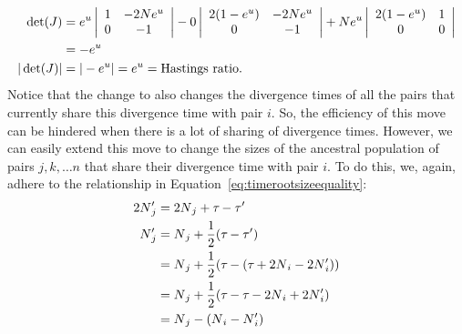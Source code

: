 \begin{linenomath}
\begin{equation}
\begin{split}
    \det(J) & = e^{\uniformdeviate} \left|\begin{array}{cc}
        1 &
        -2\sepopsize[\rootpopindex]e^{\uniformdeviate} \\
        0 &
        -1 
    \end{array}\right| - 0 \left|\begin{array}{cc}
        2(1 - e^{\uniformdeviate}) &
        -2\sepopsize[\rootpopindex]e^{\uniformdeviate} \\
        0 &
        -1
    \end{array}\right| + \sepopsize[\rootpopindex]e^{\uniformdeviate} \left|\begin{array}{cc}
        2(1 - e^{\uniformdeviate}) &
        1 \\
        0 &
        0 \\
    \end{array}\right| \\
    & = -e^{\uniformdeviate} \\
    |\det(J)| & = |-e^{\uniformdeviate}| = e^{\uniformdeviate} = \textrm{Hastings ratio}.
\end{split}
\end{equation}
Notice that the change to \divtime also changes the divergence times
of all the pairs that currently share this divergence time with pair $i$.
So, the efficiency of this move can be hindered when there is a lot of sharing
of divergence times.
However, we can easily extend this move to change the sizes of the ancestral
population of pairs $j, k, \ldots n$ that share their divergence time with
pair $i$.
To do this, we, again, adhere to the relationship in
Equation~\ref{eq:timerootsizeequality}:
\begin{equation}
\begin{split}
    2\sepopsize[\rootpopindex]{}_j\proposed
    & =
    2\sepopsize[\rootpopindex]{}_j + \divtime - \divtime\proposed \\
    \sepopsize[\rootpopindex]{}_j\proposed
    & =
    \sepopsize[\rootpopindex]{}_j + \frac{1}{2}(\divtime - \divtime\proposed) \\
    & =
    \sepopsize[\rootpopindex]{}_j + \frac{1}{2}(\divtime - (\divtime + 2\sepopsize[\rootpopindex]{}_i - 2\sepopsize[\rootpopindex]{}_i\proposed)) \\
    & =
    \sepopsize[\rootpopindex]{}_j + \frac{1}{2}(\divtime - \divtime - 2\sepopsize[\rootpopindex]{}_i + 2\sepopsize[\rootpopindex]{}_i\proposed) \\
    & =
    \sepopsize[\rootpopindex]{}_j - (\sepopsize[\rootpopindex]{}_i - \sepopsize[\rootpopindex]{}_i\proposed) \\

\end{split}
\end{equation}
\end{linenomath}
